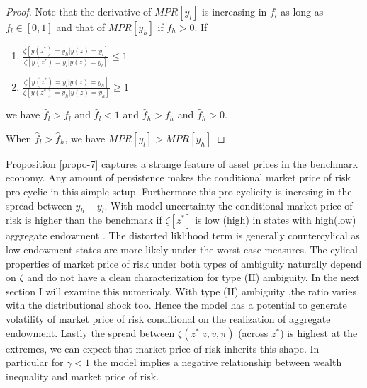 \documentclass[12pt]{article}
\begin{document}
\begin{proof}
Note that the derivative of $MPR[y_l]$ is increasing in $f_l$ as long as $f_l \in[0,1]$ and that of $MPR[y_h]$ if $f_h>0$. If \begin{enumerate}
	\item $\frac{\zeta[y(z^*)=y_h|y(z)=y_l]}{\zeta[y(z^*)=y_l|y(z)=y_l]} \leq 1$
	\item $\frac{\zeta[y(z^*)=y_l|y(z)=y_h]}{\zeta[y(z^*)=y_h|y(z)=y_h]} \geq 1$
\end{enumerate}
we have $\hat{f}_l > f_l$ and $\hat{f}_l <1$ and $\hat{f}_h > f_h$ and $\hat{f}_h > 0$.

When $\hat{f}_l > \hat{f}_h$, we have $MPR[y_l]>MPR[y_h]$ 
\end{proof}

Proposition \ref{propo-7} captures a strange feature of asset prices in the benchmark economy. Any amount of persistence makes the conditional market price of risk pro-cyclic in this simple setup. Furthermore this pro-cyclicity is incresing in the spread between $y_h-y_l$. With model uncertainty the conditional market price of risk is higher than the benchmark if $\zeta[z^*]$ is low (high) in states with high(low) aggregate endowment . The distorted liklihood term is generally countercylical as low endowment states are more likely under the worst case measures.  The cylical properties of market price of risk under both types of ambiguity naturally depend on $\zeta$ and do not have a clean characterization for type (II) ambiguity. In the next section I will examine this numericaly. With type (II) ambiguity ,the ratio varies with the distributional shock too. Hence the model has a potential to generate volatility of market price of risk conditional on the realization of aggregate endowment. Lastly the spread 
between $\zeta(z^*|z,v,\pi)$ (across $z^*$) is highest at the extremes, we can expect that market price of risk inherits this shape. In particular for $\gamma <1$ the model implies a negative relationship between wealth inequality and market price of risk.


%
\end{document}
